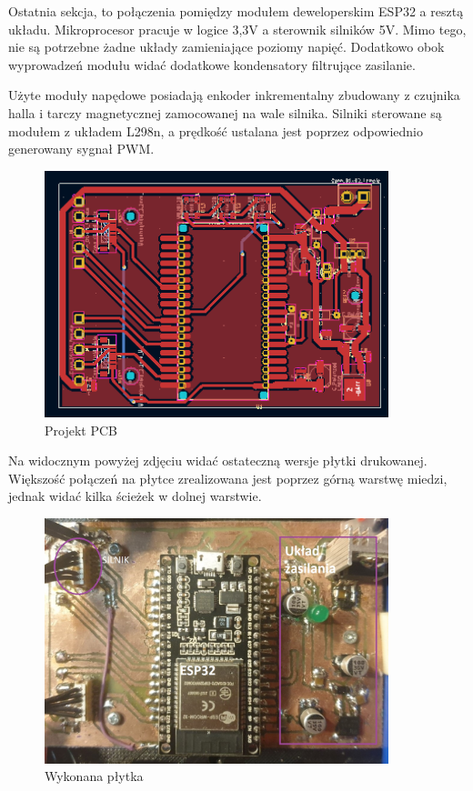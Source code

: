 Ostatnia sekcja, to połączenia pomiędzy modułem deweloperskim ESP32 a resztą układu. Mikroprocesor pracuje w logice 3,3V a sterownik silników 5V. 
Mimo tego, nie są potrzebne żadne układy zamieniające poziomy napięć. 
Dodatkowo obok wyprowadzeń modułu widać dodatkowe kondensatory filtrujące zasilanie. 
 
Użyte moduły napędowe posiadają enkoder inkrementalny zbudowany z czujnika halla i tarczy magnetycznej zamocowanej na wale silnika.
Silniki sterowane są modułem z układem L298n, a prędkość ustalana jest poprzez odpowiednio generowany sygnał PWM.
\begin{figure}[H]
	\centering
	\includegraphics[width=10cm]{pages/robot/zdjecia/kicad/kiCad_PCB.png}
	\caption{Projekt PCB}
	\label{Fig:kiCadPCB}
\end{figure}

Na widocznym powyżej zdjęciu widać ostateczną wersje płytki drukowanej. Większość połączeń na płytce zrealizowana jest poprzez górną warstwę miedzi,
jednak widać kilka ścieżek w dolnej warstwie.

\begin{figure}[H]
	\centering
	\includegraphics[width=10cm]{pages/robot/zdjecia/wykonanePCB.jpg}
	\caption{Wykonana płytka}
	\label{Fig:wykonanePCB}
\end{figure}

